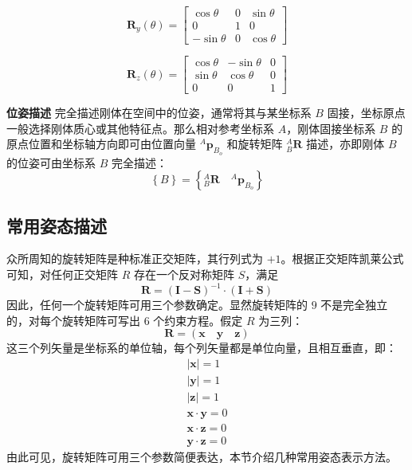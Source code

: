 \documentclass[cn,11pt,chinese,blue,bibstyle=ieeetr]{elegantbook}
\begin{document}
\begin{equation}\label{axis_y_rotation_matrix}
\bm{R}_y\left(\theta\right) = 
\begin{bmatrix}
\cos\theta  & 0 & \sin\theta \\
0           & 1 & 0          \\
-\sin\theta & 0 & \cos\theta
\end{bmatrix}
\end{equation}

\begin{equation}\label{axis_z_rotation_matrix}
\bm{R}_z\left(\theta\right) = 
\begin{bmatrix}
\cos\theta & -\sin\theta & 0 \\
\sin\theta & \cos\theta  & 0 \\
0          & 0           & 1
\end{bmatrix}
\end{equation}

\textbf{位姿描述} 完全描述刚体在空间中的位姿，通常将其与某坐标系 ${B}$ 固接，坐标原点一般选择刚体质心或其他特征点。那么相对参考坐标系 ${A}$，刚体固接坐标系 ${B}$ 的原点位置和坐标轴方向即可由位置向量 $^A\bm{p}_{B_o}$ 和旋转矩阵  $_B^A\bm{R}$ 描述，亦即刚体 $B$ 的位姿可由坐标系 ${B}$ 完全描述：
\begin{equation}
\left\lbrace B \right\rbrace = \left\lbrace _B^A\bm{R} \quad ^A\bm{p}_{B_o} \right\rbrace
\end{equation}


\subsection{常用姿态描述}

众所周知的旋转矩阵是种标准正交矩阵，其行列式为 $+1$。根据正交矩阵凯莱公式可知，对任何正交矩阵 $R$ 存在一个反对称矩阵 $S$，满足
\begin{equation}
\bm{R} = \left(\bm{I}-\bm{S}\right)^{-1} \cdot \left(\bm{I}+\bm{S}\right)
\end{equation}
因此，任何一个旋转矩阵可用三个参数确定。显然旋转矩阵的 $9$ 不是完全独立的，对每个旋转矩阵可写出 $6$ 个约束方程。假定 $R$ 为三列：
\begin{equation}
\bm{R}=\left(\bm{x} \quad \bm{y} \quad \bm{z}\right)
\end{equation}
这三个列矢量是坐标系的单位轴，每个列矢量都是单位向量，且相互垂直，即：
\begin{equation}
\begin{aligned}
|\bm{x}|=1 \\
|\bm{y}|=1 \\
|\bm{z}|=1 \\
\bm{x}\cdot\bm{y}=0 \\
\bm{x}\cdot\bm{z}=0 \\
\bm{y}\cdot\bm{z}=0
\end{aligned}
\end{equation}
由此可见，旋转矩阵可用三个参数简便表达，本节介绍几种常用姿态表示方法。
\end{document}
